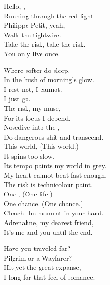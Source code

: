
Hello, , \\
Running through the red light. \\
Philippe Petit, yeah, \\
Walk the tightwire. \\
Take the risk, take the risk. \\
You only live once. \\


Where softer  do sleep. \\
In the hush of morning's glow. \\
I rest not, I cannot. \\
I just go. \\

The risk, my muse, \\
For its focus I depend. \\
Nosedive into the , \\
Do dangerous shit and transcend. \\
This world, (This world.) \\
It spins too slow. \\
Its tempo paints my world in grey. \\
My heart cannot beat fast enough. \\
The risk is technicolour paint. \\

One , (One life.) \\
One chance. (One chance.) \\
Clench the moment in your hand. \\
Adrenaline, my dearest friend, \\
It's me and you until the end. \\




Have you traveled far? \\
Pilgrim or a Wayfarer? \\
Hit yet the great expanse, \\
I long for that feel of romance. \\


